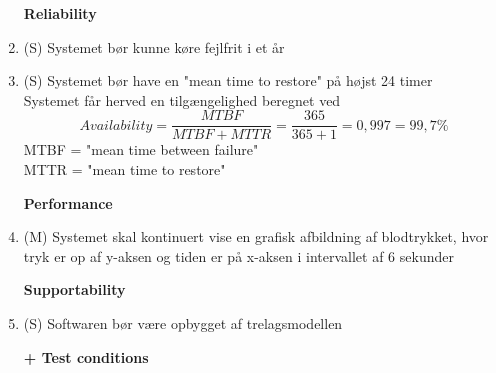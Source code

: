 \begin{enumerate}

\textbf{Reliability}
\item (S) Systemet bør kunne køre fejlfrit i et år
\item (S) Systemet bør have en "mean time to restore" på højst 24 timer\\
Systemet får herved en tilgængelighed beregnet ved
$$Availability = \frac{MTBF}{MTBF+MTTR}=\frac{365}{365+1}= 0,997 = 99,7\%$$
MTBF = "mean time between failure" \\
MTTR = "mean time to restore"\\
\newpage

\textbf{Performance}
\item (M) Systemet skal kontinuert vise en grafisk afbildning af blodtrykket, hvor tryk er op af y-aksen og tiden er på x-aksen i intervallet af 6 sekunder 

\textbf{Supportability}
\item (S) Softwaren bør være opbygget af trelagsmodellen

\textbf{+ Test conditions}
\end{enumerate}





